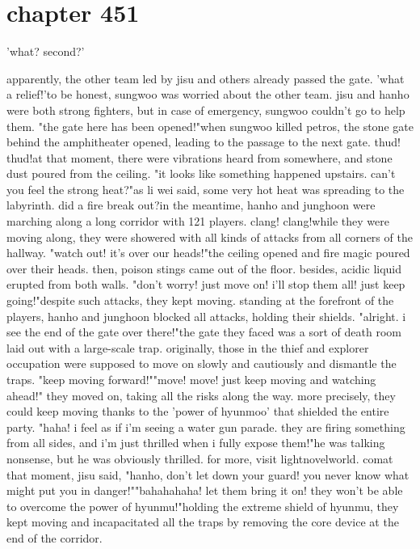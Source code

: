 \section{chapter 451}

'what? second?'




apparently, the other team led by jisu and others already passed the gate.
'what a relief!'to be honest, sungwoo was worried about the other team.
 jisu and hanho were both strong fighters, but in case of emergency, sungwoo couldn't go to help them.
"the gate here has been opened!"when sungwoo killed petros, the stone gate behind the amphitheater opened, leading to the passage to the next gate.
thud! thud!at that moment, there were vibrations heard from somewhere, and stone dust poured from the ceiling.
"it looks like something happened upstairs.
 can't you feel the strong heat?"as li wei said, some very hot heat was spreading to the labyrinth.
did a fire break out?in the meantime, hanho and junghoon were marching along a long corridor with 121 players.
clang! clang!while they were moving along, they were showered with all kinds of attacks from all corners of the hallway.
"watch out! it's over our heads!"the ceiling opened and fire magic poured over their heads.
 then, poison stings came out of the floor.
 besides, acidic liquid erupted from both walls.
"don't worry! just move on! i'll stop them all! just keep going!"despite such attacks, they kept moving.
 standing at the forefront of the players, hanho and junghoon blocked all attacks, holding their shields.
"alright.
 i see the end of the gate over there!"the gate they faced was a sort of death room laid out with a large-scale trap.
originally, those in the thief and explorer occupation were supposed to move on slowly and cautiously and dismantle the traps.
"keep moving forward!""move! move! just keep moving and watching ahead!"
they moved on, taking all the risks along the way.
 more precisely, they could keep moving thanks to the 'power of hyunmoo' that shielded the entire party.
"haha! i feel as if i'm seeing a water gun parade.
 they are firing something from all sides, and i'm just thrilled when i fully expose them!"he was talking nonsense, but he was obviously thrilled.
for more, visit lightnovelworld.
c‌omat that moment, jisu said, "hanho, don't let down your guard! you never know what might put you in danger!""bahahahaha! let them bring it on! they won't be able to overcome the power of hyunmu!"holding the extreme shield of hyunmu, they kept moving and incapacitated all the traps by removing the core device at the end of the corridor.
